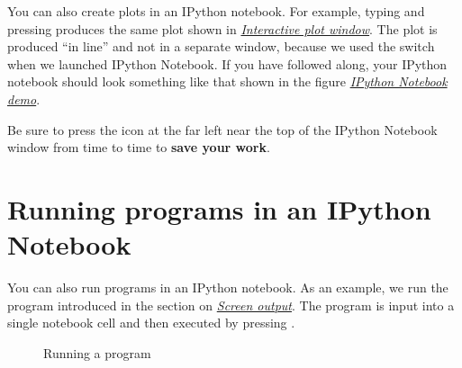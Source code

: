 \documentclass[letterpaper,10pt,english]{sphinxmanual}
\begin{document}
You can also create plots in an IPython notebook.  For example, typing  and pressing  produces  the same plot shown in {\hyperref[chap5/chap5_plot:fig-zigzagplotdemo]{\emph{Interactive plot window}}}.  The plot is produced ``in line'' and not in a separate window, because we used the  switch when we launched IPython Notebook.  If you have followed along, your IPython notebook should look something like that shown in the figure {\hyperref[apdx2/apdx2_ipynb:fig-firstipynbcells]{\emph{IPython Notebook demo}}}.

Be sure to press the  icon at the far left near the top of the IPython Notebook window from time to time to \textbf{save your work}.


\section{Running programs in an IPython Notebook}
\label{apdx2/apdx2_ipynb:running-programs-in-an-ipython-notebook}
You can also run programs in an IPython notebook.  As an example, we run the program introduced in the section on {\hyperref[chap4/chap4_io:screenoutput]{\emph{Screen output}}}.  The program is input into a single notebook cell and then executed by pressing .
\begin{figure}[htbp]
\centering
\capstart

\caption{Running a program}\label{apdx2/apdx2_ipynb:fig-mileagenb}\end{figure}
\end{document}
